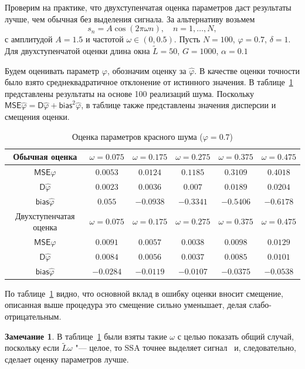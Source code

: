 \documentclass[specialist,
substylefile = spbu_report.rtx,
subf,href,colorlinks=true, 12pt]{disser}
\theoremstyle{definition}
\newtheorem{remark}{Замечание}
\begin{document}
Проверим на практике, что двухступенчатая оценка параметров даст результаты лучше, чем обычная без выделения сигнала. За альтернативу возьмем
\begin{equation}\label{eq:noise_est_h1}
s_n=A\cos(2\pi\omega n),\quad n=1,\ldots,N,
\end{equation}
с амплитудой $A=1.5$ и частотой $\omega\in(0,0.5)$. Пусть $N=100$, $\varphi=0.7$, $\delta=1$. Для двухступенчатой оценки длина окна $\widetilde L=50$, $G=1000$, $\alpha=0.1$

Будем оценивать параметр $\varphi$, обозначим оценку за $\hat\varphi$. В качестве оценки точности было взято среднеквадратичное отклонение от истинного значения. В таблице~\ref{tab:param_estim} представлены результаты на основе 100 реализаций шума. Поскольку $\mathsf{MSE}\hat\varphi=\mathsf{D}\hat\varphi + \mathsf{bias}^2\hat\varphi$, в таблице также представлены значения дисперсии и смещения оценки.

\begin{table}[h]
	\centering
	\begin{tabular}{|cccccc|}
		\hline
		Обычная оценка & $\omega = 0.075$ & $\omega=0.175$ & $\omega=0.275$ & $\omega=0.375$ & $\omega=0.475$ \\
		\hline
		$\mathsf{MSE}\hat\varphi$ & $0.0053$ & $0.0124$ & $0.1185$ & $0.3109$ & $0.4018$ \\
		\hline
		$\mathsf{D}\hat\varphi$ & $0.0023$ & $0.0036$ & $0.007$ & $0.0189$ & $0.0204$ \\
		\hline
		$\mathsf{bias}\hat\varphi$ & $0.055$ & $-0.0938$ & $-0.3341$ & $-0.5406$ & $-0.6178$\\
		\hhline{======}
		Двухступенчатая оценка & $\omega = 0.075$ & $\omega=0.175$ & $\omega=0.275$ & $\omega=0.375$ & $\omega=0.475$ \\
		\hline
		$\mathsf{MSE}\hat\varphi$ & $0.0091$ & $0.0057$ & $0.0038$ & $0.0098$ & $0.0129$ \\
		\hline
		$\mathsf{D}\hat\varphi$ & $0.0084$ & $0.0056$ & $0.0037$ & $0.0085$ & $0.0101$ \\
		\hline
		$\mathsf{bias}\hat\varphi$ & $-0.0284$ & $-0.0119$ & $-0.0107$ & $-0.0375$ & $-0.0538$\\
		\hline
	\end{tabular}
	\caption{Оценка параметров красного шума ($\varphi=0.7$)}
	\label{tab:param_estim}
\end{table}

По таблице~\ref{tab:param_estim} видно, что основной вклад в ошибку оценки вносит смещение, описанная выше процедура это смещение сильно уменьшает, делая слабо-отрицательным.
\begin{remark}
	В таблице~\ref{tab:param_estim} были взяты такие $\omega$ с целью показать общий случай, поскольку если $\widetilde L\omega$ "--- целое, то SSA точнее выделяет сигнал~\cite{ssa_an} и, следовательно, сделает оценку параметров лучше.
\end{remark}
\end{document}
